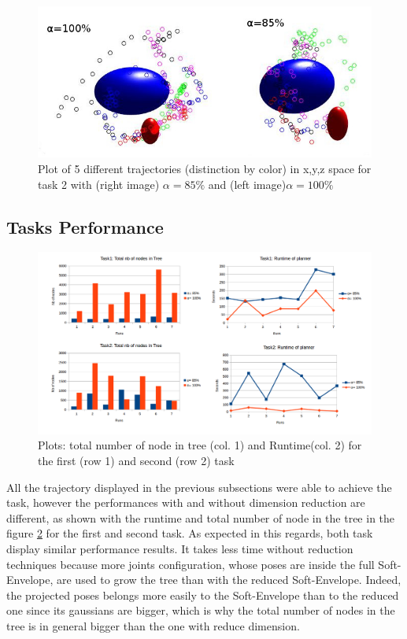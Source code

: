 \documentclass[letterpaper, 10 pt, conference]{ieeeconf}  %
\begin{document}
\begin{figure}[h]
	\centering
	\includegraphics[scale=0.38]{figure/gaussianTask2.jpg}
	\caption{Plot of 5 different trajectories (distinction by color) in x,y,z space for task 2 with (right image) $\alpha = 85\%$ and (left image)$\alpha = 100\%$ }
	\label{task2ModelGaussian}
\end{figure}
\subsection{Tasks Performance}
\begin{figure}[h]
	\centering
	\includegraphics[scale=0.27]{figure/RunTimeAndNbNodeTask1_2.jpg}
	\caption{Plots: total number of node in tree (col. 1) and Runtime(col. 2) for the first (row 1) and second (row 2) task }
	\label{plotGraphAll}
\end{figure}
All the trajectory displayed in the previous subsections were able to achieve the task, however the performances with and without dimension reduction are different, as shown with the runtime and total number of node in the tree in the figure \ref{plotGraphAll} for the first and second task. 
As expected in this regards, both task display similar performance results.  It takes less time without reduction techniques because more joints configuration, whose poses are inside the full Soft-Envelope, are used to grow the tree than with the reduced Soft-Envelope. Indeed, the projected poses belongs more easily to the Soft-Envelope than to the reduced one since its gaussians are bigger, which is why the total number of nodes in the tree is in general bigger than the one with reduce dimension. 
\end{document}

